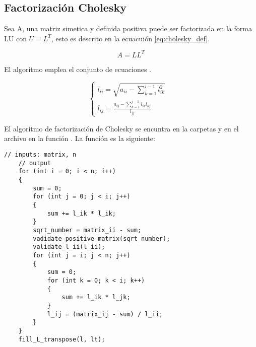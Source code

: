 \subsection{Factorización Cholesky}

Sea A, una matriz simetica y definida positiva puede ser factorizada en la forma LU con $U=L^T$, esto es descrito en la ecuacuión \ref{eq:cholesky_def}.

\begin{equation}
    A=LL^T \label{eq:cholesky_def}
\end{equation}

El algoritmo emplea el conjunto de ecuaciones .

\begin{equation}
    \begin{cases}
        l_{ii} = \sqrt{a_{ii}- \sum\limits_{k=1}^{i-1} l_{ik}^2}           & \\
        l_{ij} = \frac{a_{ij}-\sum\limits_{k=1}^{j-1}l_{ik}l_{kj}}{l_{jj}} &
    \end{cases}
\end{equation}

El algoritmo de factorización de Cholesky se encuntra en la carpetas  y  en el archivo  en la función . La función es la siguiente:

\begin{lstlisting}[style=CStyle]
    // inputs: matrix, n
    // output
    for (int i = 0; i < n; i++)
    {
        sum = 0;
        for (int j = 0; j < i; j++)
        {
            sum += l_ik * l_ik;
        }
        sqrt_number = matrix_ii - sum;
        vadidate_positive_matrix(sqrt_number);
        validate_l_ii(l_ii);
        for (int j = i; j < n; j++)
        {
            sum = 0;
            for (int k = 0; k < i; k++)
            {
                sum += l_ik * l_jk;
            }
            l_ij = (matrix_ij - sum) / l_ii;
        }
    }
    fill_L_transpose(l, lt);
\end{lstlisting}